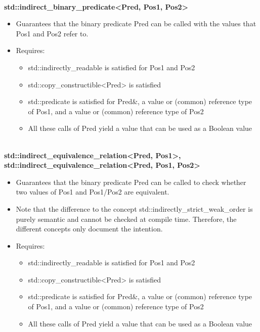 \noindent
\hspace*{\fill} \\ %
\textbf{std::indirect\_binary\_predicate<Pred, Pos1, Pos2>}

\begin{itemize}
\item
Guarantees that the binary predicate Pred can be called with the values that Pos1 and Pos2 refer to.

\item
Requires:
\begin{itemize}
\item
std::indirectly\_readable is satisfied for Pos1 and Pos2

\item
std::copy\_constructible<Pred> is satisfied

\item
std::predicate is satisfied for Pred\&, a value or (common) reference type of Pos1, and a value or (common) reference type of Pos2

\item
All these calls of Pred yield a value that can be used as a Boolean value
\end{itemize}
\end{itemize}

\noindent
\hspace*{\fill} \\ %
\textbf{std::indirect\_equivalence\_relation<Pred, Pos1>, std::indirect\_equivalence\_relation<Pred, Pos1, Pos2>}

\begin{itemize}
\item
Guarantees that the binary predicate Pred can be called to check whether two values of Pos1 and Pos1/Pos2 are equivalent.

\item
Note that the difference to the concept std::indirectly\_strict\_weak\_order is purely semantic and cannot be checked at compile time. Therefore, the different concepts only document the intention.

\item
Requires:
\begin{itemize}
\item
std::indirectly\_readable is satisfied for Pos1 and Pos2

\item
std::copy\_constructible<Pred> is satisfied

\item
std::predicate is satisfied for Pred\&, a value or (common) reference type of Pos1, and a value or (common) reference type of Pos2

\item
All these calls of Pred yield a value that can be used as a Boolean value
\end{itemize}
\end{itemize}


